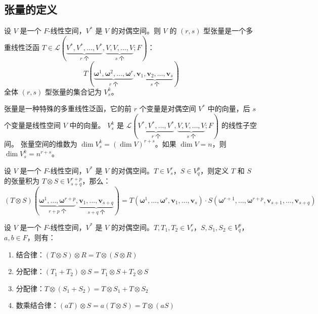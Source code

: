 \subsection{张量的定义}

\begin{definition}[张量 Tensor]
    设 $V$ 是一个 $F$-线性空间，$V^*$ 是 $V$ 的对偶空间。则 $V$ 的 $(r,s)$ 型张量是一个多重线性泛函 $T \in \mathcal{L}(\underbrace{V^*,V^*,\ldots,V^*}_{r\text{ 个}},\underbrace{V,V,\ldots,V}_{s\text{ 个}};F)$：
    \[
        T(\underbrace{\bm{\omega}^1,\bm{\omega}^2,\ldots,\bm{\omega}^r}_{r\text{ 个}},\underbrace{\mathbf{v}_1,\mathbf{v}_2,\ldots,\mathbf{v}_s}_{s\text{ 个}})
    \]
    全体 $(r,s)$ 型张量的集合记为 $V^k_s$。
\end{definition}

\begin{note}
    张量是一种特殊的多重线性泛函，它的前 $r$ 个变量是对偶空间 $V^*$ 中的向量，后 $s$ 个变量是线性空间 $V$ 中的向量。
    $V^k_s$ 是 $\mathcal{L}(\underbrace{V^*,V^*,\ldots,V^*}_{r\text{ 个}},\underbrace{V,V,\ldots,V}_{s\text{ 个}};F)$ 的线性子空间。
    张量空间的维数为 $\dim V^k_s = (\dim V)^{r+s}$。如果 $\dim V = n$，则 $\dim V^k_s = n^{r+s}$。
\end{note}

\vspace{1em}

\begin{definition}
    设 $V$ 是一个 $F$-线性空间，$V^*$ 是 $V$ 的对偶空间。$T \in V^r_s$，$S \in V^p_q$，则定义 $T$ 和 $S$ 的张量积为 $T \otimes S \in V^{r+p}_{s+q}$，那么：
    \[
        (T \otimes S)(\underbrace{\bm{\omega}^1,\ldots,\bm{\omega}^{r+p}}_{r+p\text{ 个}},\underbrace{\mathbf{v}_1,\ldots,\mathbf{v}_{s+q}}_{s+q\text{ 个}}) = T(\bm{\omega}^1,\ldots,\bm{\omega}^r,\mathbf{v}_1,\ldots,\mathbf{v}_s) \cdot S(\bm{\omega}^{r+1},\ldots,\bm{\omega}^{r+p},\mathbf{v}_{s+1},\ldots,\mathbf{v}_{s+q})
    \]
    \label{def:tensor_product}
\end{definition}

\begin{proposition}[张量积的性质]
    设 $V$ 是一个 $F$-线性空间，$V^*$ 是 $V$ 的对偶空间。$T,T_1,T_2 \in V^r_s$，$S,S_1,S_2 \in V^p_q$，$a,b\in F$，则有：
    \begin{enumerate}
        \item 结合律：$(T \otimes S) \otimes R = T \otimes (S \otimes R)$
        \item 分配律：$(T_1 + T_2) \otimes S = T_1 \otimes S + T_2 \otimes S$
        \item 分配律：$T \otimes (S_1 + S_2) = T \otimes S_1 + T \otimes S_2$
        \item 数乘结合律：$(aT) \otimes S = a(T \otimes S) = T \otimes (aS)$
    \end{enumerate}
\end{proposition}

